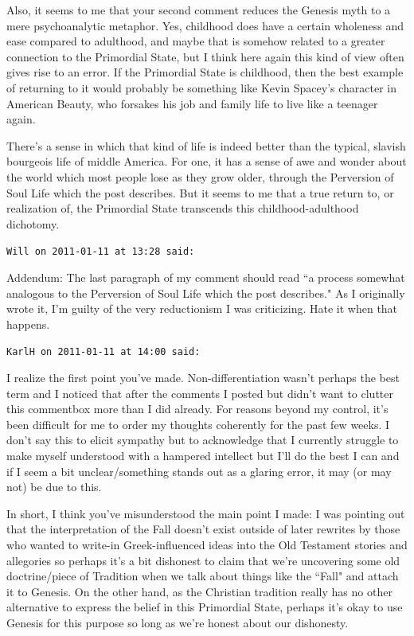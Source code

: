 \begin{footnotesize}
\begin{sffamily}
Also, it seems to me that your second comment reduces the Genesis myth to a mere psychoanalytic metaphor. Yes, childhood does have a certain wholeness and ease compared to adulthood, and maybe that is somehow related to a greater connection to the Primordial State, but I think here again this kind of view often gives rise to an error. If the Primordial State is childhood, then the best example of returning to it would probably be something like Kevin Spacey's character in American Beauty, who forsakes his job and family life to live like a teenager again.

There's a sense in which that kind of life is indeed better than the typical, slavish bourgeois life of middle America. For one, it has a sense of awe and wonder about the world which most people lose as they grow older, through the Perversion of Soul Life which the post describes. But it seems to me that a true return to, or realization of, the Primordial State transcends this childhood-adulthood dichotomy.


\hfill

\texttt{Will on 2011-01-11 at 13:28 said: }

Addendum: The last paragraph of my comment should read ``a process somewhat analogous to the Perversion of Soul Life which the post describes." As I originally wrote it, I'm guilty of the very reductionism I was criticizing. Hate it when that happens.


\hfill

\texttt{KarlH on 2011-01-11 at 14:00 said: }

I realize the first point you've made. Non-differentiation wasn't perhaps the best term and I noticed that after the comments I posted but didn't want to clutter this commentbox more than I did already. For reasons beyond my control, it's been difficult for me to order my thoughts coherently for the past few weeks. I don't say this to elicit sympathy but to acknowledge that I currently struggle to make myself understood with a hampered intellect but I'll do the best I can and if I seem a bit unclear/something stands out as a glaring error, it may (or may not) be due to this.

In short, I think you've misunderstood the main point I made: I was pointing out that the interpretation of the Fall doesn't exist outside of later rewrites by those who wanted to write-in Greek-influenced ideas into the Old Testament stories and allegories so perhaps it's a bit dishonest to claim that we're uncovering some old doctrine/piece of Tradition when we talk about things like the ``Fall" and attach it to Genesis. On the other hand, as the Christian tradition really has no other alternative to express the belief in this Primordial State, perhaps it's okay to use Genesis for this purpose so long as we're honest about our dishonesty.


\end{sffamily}
\end{footnotesize}
